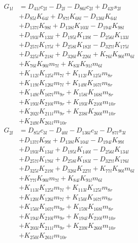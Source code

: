 \begin{multicols}{2}
\begin{align}
G_{1l} &= D_{41l}c_{2l} - D_{2l} - D_{86l}c_{2l} + D_{42l}s_{2l}  \nonumber \\
&+ D_{85l}K_{64l} + D_{87l}K_{68l} - D_{136l}K_{64l}  \nonumber \\
&+ D_{137l}K_{98l} + D_{138l}K_{103l} - D_{194l}K_{98l}  \nonumber \\
&+ D_{193l}K_{133l} + D_{195l}K_{139l} - D_{256l}K_{133l}  \nonumber \\
&+ D_{257l}K_{175l} + D_{258l}K_{182l} - D_{327l}K_{175l}  \nonumber \\
&+ D_{325l}K_{218l} + D_{326l}K_{226l} + K_{76l}K_{90l}m_{6l}  \nonumber \\
&+ K_{76l}K_{90l}m_{7l} + K_{83l}K_{91l}m_{6l}  \nonumber \\
&+ K_{112l}K_{125l}m_{7l} + K_{112l}K_{125l}m_{8r}  \nonumber \\
&+ K_{119l}K_{126l}m_{7l} + K_{149l}K_{167l}m_{8r}  \nonumber \\
&+ K_{149l}K_{167l}m_{9r} + K_{158l}K_{168l}m_{8r}  \nonumber \\
&+ K_{193l}K_{210l}m_{9r} + K_{193l}K_{210l}m_{10r}  \nonumber \\
&+ K_{202l}K_{211l}m_{9r} + K_{238l}K_{260l}m_{10r}  \nonumber \\
&+ K_{249l}K_{261l}m_{10r} \nonumber \\
G_{2l} &= D_{85l}c_{3l} - D_{40l} - D_{136l}c_{3l} - D_{87l}s_{3l}  \nonumber \\
&+ D_{137l}K_{99l} + D_{138l}K_{104l} - D_{194l}K_{99l}  \nonumber \\
&+ D_{193l}K_{134l} + D_{195l}K_{140l} - D_{256l}K_{134l}  \nonumber \\
&+ D_{257l}K_{176l} + D_{258l}K_{183l} - D_{327l}K_{176l}  \nonumber \\
&+ D_{325l}K_{219l} + D_{326l}K_{227l} + K_{77l}K_{90l}m_{6l}  \nonumber \\
&+ K_{77l}K_{90l}m_{7l} + K_{84l}K_{91l}m_{6l}  \nonumber \\
&+ K_{113l}K_{125l}m_{7l} + K_{113l}K_{125l}m_{8r}  \nonumber \\
&+ K_{120l}K_{126l}m_{7l} + K_{150l}K_{167l}m_{8r}  \nonumber \\
&+ K_{150l}K_{167l}m_{9r} + K_{159l}K_{168l}m_{8r}  \nonumber \\
&+ K_{194l}K_{210l}m_{9r} + K_{194l}K_{210l}m_{10r}  \nonumber \\
&+ K_{203l}K_{211l}m_{9r} + K_{239l}K_{260l}m_{10r}  \nonumber \\
&+ K_{250l}K_{261l}m_{10r} \nonumber \\

\end{align}
\end{multicols}
